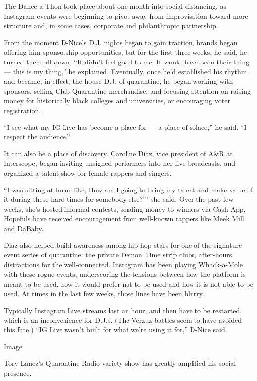 The Dance-a-Thon took place about one month into social distancing, as
Instagram events were beginning to pivot away from improvisation toward
more structure and, in some cases, corporate and philanthropic
partnership.

From the moment D-Nice's D.J. nights began to gain traction, brands
began offering him sponsorship opportunities, but for the first three
weeks, he said, he turned them all down. ``It didn't feel good to me. It
would have been their thing --- this is my thing,'' he explained.
Eventually, once he'd established his rhythm and became, in effect, the
house D.J. of quarantine, he began working with sponsors, selling Club
Quarantine merchandise, and focusing attention on raising money for
historically black colleges and universities, or encouraging voter
registration.

``I see what my IG Live has become a place for --- a place of solace,''
he said. ``I respect the audience.''

It can also be a place of discovery. Caroline Diaz, vice president of
A\&R at Interscope, began inviting unsigned performers into her live
broadcasts, and organized a talent show for female rappers and singers.

``I was sitting at home like, How am I going to bring my talent and make
value of it during these hard times for somebody else?''' she said. Over
the past few weeks, she's hosted informal contests, sending money to
winners via Cash App. Hopefuls have received encouragement from
well-known rappers like Meek Mill and DaBaby.

Diaz also helped build awareness among hip-hop stars for one of the
signature event series of quarantine: the private
\href{https://www.nytimes3xbfgragh.onion/2020/04/10/style/justin-laboy-instagram-strip-clubs-live.html}{Demon
Time} strip clubs, after-hours distractions for the well-connected.
Instagram has been playing Whack-a-Mole with these rogue events,
underscoring the tensions between how the platform is meant to be used,
how it would prefer not to be used and how it is not able to be used. At
times in the last few weeks, those lines have been blurry.

Typically Instagram Live streams last an hour, and then have to be
restarted, which is an inconvenience for D.J.s. (The Verzuz battles seem
to have avoided this fate.) ``IG Live wasn't built for what we're using
it for,'' D-Nice said.

Image

Tory Lanez's Quarantine Radio variety show has greatly amplified his
social presence.

